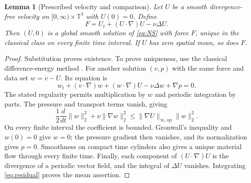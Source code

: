 \documentclass[11pt]{article}
\newtheorem{lemma}[theorem]{Lemma}
\theoremstyle{remark}\newtheorem{remark}[theorem]{Remark}
\newcommand{\T}{\mathbb T}\newcommand{\R}{\mathbb R}
\begin{document}
\begin{lemma}[Prescribed velocity and comparison]\label{lem:realization}
Let $U$ be a smooth divergence-free velocity on
$[0,\infty)\times\T^3$ with $U(0)=0$. Define
\begin{equation}\label{eq:residual}
 F=U_t+(U\cdot\nabla)U-\nu\Delta U.
\end{equation}
Then $(U,0)$ is a global smooth solution of \eqref{eq:NS} with force
$F$, unique in the classical class on every finite time interval.
If $U$ has zero spatial mean, so does $F$.
\end{lemma}
\begin{proof}
Substitution proves existence. To prove uniqueness, use the classical
difference-energy method \cite[Section~18]{Leray1934}. For another
solution $(v,p)$ with the same force and data set $w=v-U$.
Its equation is
\[
 w_t+(v\cdot\nabla)w+(w\cdot\nabla)U-\nu\Delta w+\nabla p=0.
\]
The stated regularity permits multiplication by $w$ and periodic
integration by parts. The pressure and transport terms vanish, giving
\[
 \frac12\frac{d}{dt}\|w\|_2^2+\nu\|\nabla w\|_2^2
 \le\|\nabla U\|_{\infty,\mathrm{op}}\|w\|_2^2.
\]
On every finite interval the coefficient is bounded. Gronwall's
inequality and $w(0)=0$ give $w=0$; the pressure gradient then vanishes,
and its normalization gives $p=0$. Smoothness on compact time cylinders
also gives a unique material flow through every finite time.
Finally, each component of $(U\cdot\nabla)U$ is the divergence of a
periodic vector field, and the integral of $\Delta U$ vanishes.
Integrating \eqref{eq:residual} proves the mean assertion.
\end{proof}
\end{document}
